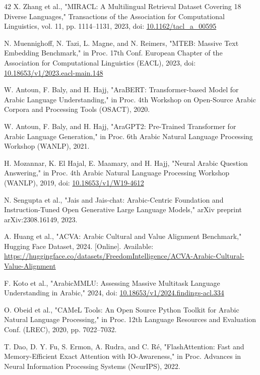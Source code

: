 \documentclass[pdflatex,sn-basic,Numbered]{sn-jnl}
\begin{document}
\begin{thebibliography}{42}
 X. Zhang et al., "MIRACL: A Multilingual Retrieval Dataset Covering 18 Diverse Languages," Transactions of the Association for Computational Linguistics, vol. 11, pp. 1114--1131, 2023, doi: \href{https://doi.org/10.1162/tacl\_a\_00595}{10.1162/tacl\_a\_00595}

 N. Muennighoff, N. Tazi, L. Magne, and N. Reimers, "MTEB: Massive Text Embedding Benchmark," in Proc. 17th Conf. European Chapter of the Association for Computational Linguistics (EACL), 2023, doi: \href{https://doi.org/10.18653/v1/2023.eacl-main.148}{10.18653/v1/2023.eacl-main.148}

 W. Antoun, F. Baly, and H. Hajj, "AraBERT: Transformer-based Model for Arabic Language Understanding," in Proc. 4th Workshop on Open-Source Arabic Corpora and Processing Tools (OSACT), 2020.

 W. Antoun, F. Baly, and H. Hajj, "AraGPT2: Pre-Trained Transformer for Arabic Language Generation," in Proc. 6th Arabic Natural Language Processing Workshop (WANLP), 2021.

 H. Mozannar, K. El Hajal, E. Maamary, and H. Hajj, "Neural Arabic Question Answering," in Proc. 4th Arabic Natural Language Processing Workshop (WANLP), 2019, doi: \href{https://doi.org/10.18653/v1/W19-4612}{10.18653/v1/W19-4612}

 N. Sengupta et al., "Jais and Jais-chat: Arabic-Centric Foundation and Instruction-Tuned Open Generative Large Language Models," arXiv preprint arXiv:2308.16149, 2023.

 A. Huang et al., "ACVA: Arabic Cultural and Value Alignment Benchmark," Hugging Face Dataset, 2024. [Online]. Available: \url{https://huggingface.co/datasets/FreedomIntelligence/ACVA-Arabic-Cultural-Value-Alignment}

 F. Koto et al., "ArabicMMLU: Assessing Massive Multitask Language Understanding in Arabic," 2024, doi: \href{https://doi.org/10.18653/v1/2024.findings-acl.334}{10.18653/v1/2024.findings-acl.334}

 O. Obeid et al., "CAMeL Tools: An Open Source Python Toolkit for Arabic Natural Language Processing," in Proc. 12th Language Resources and Evaluation Conf. (LREC), 2020, pp. 7022--7032.

 T. Dao, D. Y. Fu, S. Ermon, A. Rudra, and C. Ré, "FlashAttention: Fast and Memory-Efficient Exact Attention with IO-Awareness," in Proc. Advances in Neural Information Processing Systems (NeurIPS), 2022.


\end{thebibliography}
\end{document}
